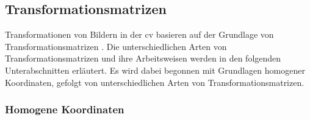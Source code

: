 
\vfill
\subsection{Transformationsmatrizen}
\label{sec:transformations_matrizen}

Transformationen von Bildern in der \ac{cv} basieren auf der Grundlage von Transformationsmatrizen \cite{transformationen_1,transformationen_2,cv_general}. Die unterschiedlichen Arten von Transformationsmatrizen und ihre Arbeitsweisen werden in den folgenden Unterabschnitten erläutert. Es wird dabei begonnen mit Grundlagen homogener Koordinaten, gefolgt von unterschiedlichen Arten von Transformationsmatrizen.

\vfill
\subsubsection{Homogene Koordinaten}
\label{sec:homogene_koordinaten}

